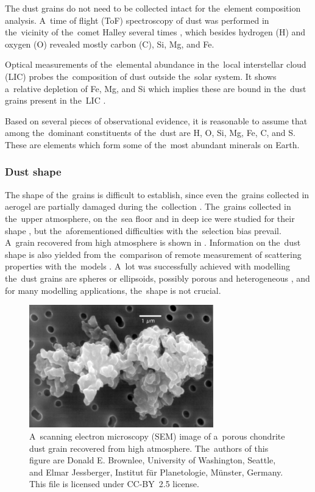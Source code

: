 The dust grains do not need to be collected intact for the~element composition analysis. A~time of flight ({ToF}) spectroscopy of dust was performed in the~vicinity of the~comet {Halley} several times \citep{jessberger1988aspects}, which besides hydrogen ({H}) and oxygen ({O}) revealed mostly carbon ({C}), {Si}, {Mg}, and {Fe}. 

Optical measurements of the~elemental abundance in the~local interstellar cloud (LIC) probes the~composition of dust outside the~solar system. It shows a~relative depletion of {Fe}, {Mg}, and {Si} which implies these are bound in the~dust grains present in the~LIC \citep{sofia1994abundant}. 

Based on several pieces of observational evidence, it is reasonable to assume that among the~dominant constituents of the~dust are {H}, {O}, {Si}, {Mg}, {Fe}, {C}, and {S}. These are elements which form some of the~most abundant minerals on Earth.

\subsubsection{Dust shape}

The shape of the~grains is difficult to establish, since even the~grains collected in aerogel are partially damaged during the~collection \citep{burchell2006cosmic}. The~grains collected in the~upper atmosphere, on the~sea floor and in deep ice were studied for their shape \citep{jessberger2001properties}, but the~aforementioned difficulties with the~selection bias prevail. A~grain recovered from high atmosphere is shown in . Information on the~dust shape is also yielded from the~comparison of remote measurement of scattering properties with the~models \citep{min2005modeling}. A~lot was successfully achieved with modelling the~dust grains are spheres or ellipsoids, possibly porous and heterogeneous  \citep{mann2010interstellar}, and for many modelling applications, the~shape is not crucial.

\begin{figure}[t]
 	\centering
 	\includegraphics[width=8cm]{figures/grain.jpg}
 	\caption{A~scanning electron microscopy ({SEM}) image of a~porous chondrite dust grain recovered from high atmosphere. The~authors of this figure are Donald E. Brownlee, University of Washington, Seattle, and Elmar Jessberger, Institut für Planetologie, Münster, Germany.
This file is licensed under \mbox{CC-BY 2.5} license.}
 	\label{fig:dust_grain}
\end{figure}

